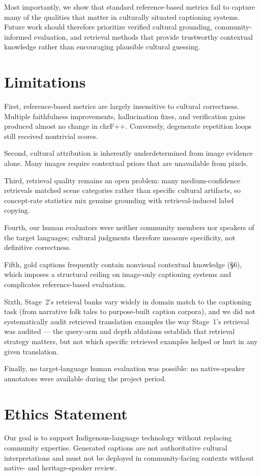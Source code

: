 \documentclass[11pt]{article}
\begin{document}
Most importantly, we show that standard reference-based metrics fail to
capture many of the qualities that matter in culturally situated captioning
systems. Future work should therefore prioritize verified cultural
grounding, community-informed evaluation, and retrieval methods that provide
trustworthy contextual knowledge rather than encouraging plausible cultural
guessing.

\section*{Limitations}
First, reference-based metrics are largely insensitive to cultural
correctness. Multiple faithfulness improvements, hallucination fixes, and
verification gains produced almost no change in chrF++. Conversely,
degenerate repetition loops still received nontrivial scores.

Second, cultural attribution is inherently underdetermined from image
evidence alone. Many images require contextual priors that are unavailable
from pixels.

Third, retrieval quality remains an open problem: many medium-confidence
retrievals matched scene categories rather than specific cultural
artifacts, so concept-rate statistics mix genuine grounding with
retrieval-induced label copying.

Fourth, our human evaluators were neither community members nor speakers of
the target languages; cultural judgments therefore measure specificity, not
definitive correctness.

Fifth, gold captions frequently contain nonvisual contextual knowledge
(\S6), which imposes a structural ceiling on image-only captioning systems
and complicates reference-based evaluation.

Sixth, Stage~2's retrieval banks vary widely in domain match to the
captioning task (from narrative folk tales to purpose-built caption
corpora), and we did not systematically audit retrieved translation
examples the way Stage~1's retrieval was audited --- the query-arm and
depth ablations establish that retrieval strategy matters, but not
which specific retrieved examples helped or hurt in any given translation.

Finally, no target-language human evaluation was possible: no
native-speaker annotators were available during the project period.

\section*{Ethics Statement}
Our goal is to support Indigenous-language technology without replacing
community expertise. Generated captions are not authoritative cultural
interpretations and must not be deployed in community-facing contexts
without native- and heritage-speaker review.
\end{document}
